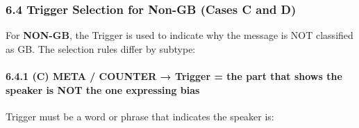 \documentclass[12pt,oneside,openright,a4paper]{cpe-english-project}
\begin{document}
\subsubsection{6.4 Trigger Selection for Non-GB (Cases C and D)}\label{trigger-selection-for-non-gb-cases-c-and-d}

For \textbf{NON-GB}, the Trigger is used to indicate why the message is
NOT classified as GB. The selection rules differ by subtype:

\paragraph{6.4.1 (C) META / COUNTER → Trigger = the part that shows the speaker is NOT the one expressing bias}\label{c-meta-counter-trigger-the-part-that-shows-the-speaker-is-not-the-one-expressing-bias}

Trigger must be a word or phrase that indicates the speaker is:
\end{document}
